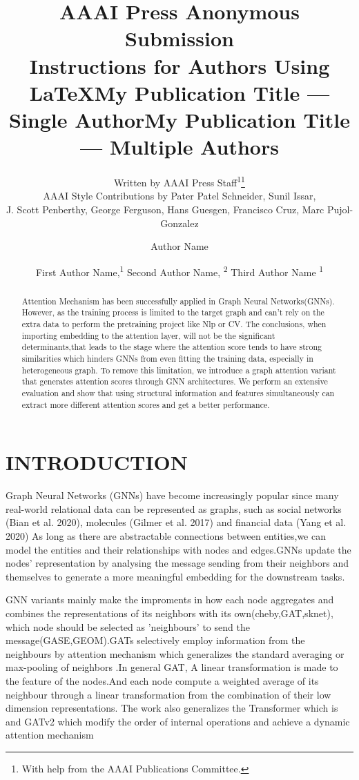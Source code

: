 \documentclass[letterpaper]{article} %
\title{AAAI Press Anonymous Submission\\Instructions for Authors Using \LaTeX{}}
\author{
    Written by AAAI Press Staff\textsuperscript{\rm 1}\thanks{With help from the AAAI Publications Committee.}\\
    AAAI Style Contributions by Pater Patel Schneider,
    Sunil Issar,\\
    J. Scott Penberthy,
    George Ferguson,
    Hans Guesgen,
    Francisco Cruz\equalcontrib,
    Marc Pujol-Gonzalez\equalcontrib
}
\title{My Publication Title --- Single Author}
\author {
    Author Name
}
\title{My Publication Title --- Multiple Authors}
\author {
    First Author Name,\textsuperscript{\rm 1}
    Second Author Name, \textsuperscript{\rm 2}
    Third Author Name \textsuperscript{\rm 1}
}
\begin{document}
\maketitle

\begin{abstract}


Attention Mechanism has been successfully applied in Graph Neural Networks(GNNs). However, as the training process is limited to the target graph and can't rely on the extra data to perform the pretraining project like Nlp or CV. The conclusions, when importing embedding to the attention layer, will not be the significant determinants,that leads to the stage where the attention score tends to have strong similarities which hinders GNNs from even fitting the training data, especially in heterogeneous graph. To remove this limitation, we introduce a graph attention variant that generates attention scores through GNN architectures. We perform an extensive evaluation and show that using structural information and features simultaneously can extract more different attention scores and get a better performance.

\end{abstract}

\section{ INTRODUCTION}

Graph Neural Networks (GNNs) have become increasingly
popular since many real-world relational data can be represented as graphs, such as social networks (Bian et al. 2020),
molecules (Gilmer et al. 2017) and financial data (Yang
et al. 2020)%
As long as there are abstractable connections between entities,we can model the entities and their relationships with nodes and edges.GNNs update the nodes' representation by analysing the message sending from their neighbors and themselves to generate a more meaningful embedding for the downstream tasks.


GNN variants mainly make the improments in how each node aggregates and combines the representations of its neighbors with its own(cheby,GAT,sknet), which node should be  selected as 'neighbours' to send the message(GASE,GEOM).GATs selectively employ information from the neighbours by attention mechanism which generalizes the standard averaging or max-pooling of neighbors %
.In general GAT, A linear transformation is made to the feature of the nodes.And each node compute a weighted average of its neighbour through a linear transformation from the combination of their low dimension representations. The work also generalizes the Transformer %
which is%
and GATv2 %
which modify the order of internal operations and achieve a dynamic attention mechanism
\end{document}
